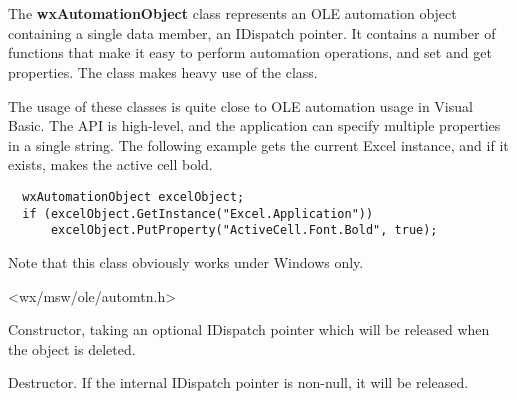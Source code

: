 \section{}\label{wxautomationobject}

The {\bf wxAutomationObject} class represents an OLE automation object containing a single data member,
an IDispatch pointer. It contains a number of functions that make it easy to perform
automation operations, and set and get properties. The class makes heavy use of the  class.

The usage of these classes is quite close to OLE automation usage in Visual Basic. The API is
high-level, and the application can specify multiple properties in a single string. The following example
gets the current Excel instance, and if it exists, makes the active cell bold.

{\small
\begin{verbatim}
  wxAutomationObject excelObject;
  if (excelObject.GetInstance("Excel.Application"))
      excelObject.PutProperty("ActiveCell.Font.Bold", true);
\end{verbatim}
}

Note that this class obviously works under Windows only.




<wx/msw/ole/automtn.h>






\label{wxautomationobjectctor}


Constructor, taking an optional IDispatch pointer which will be released when the
object is deleted.

\label{wxautomationobjectdtor}


Destructor. If the internal IDispatch pointer is non-null, it will be released.


